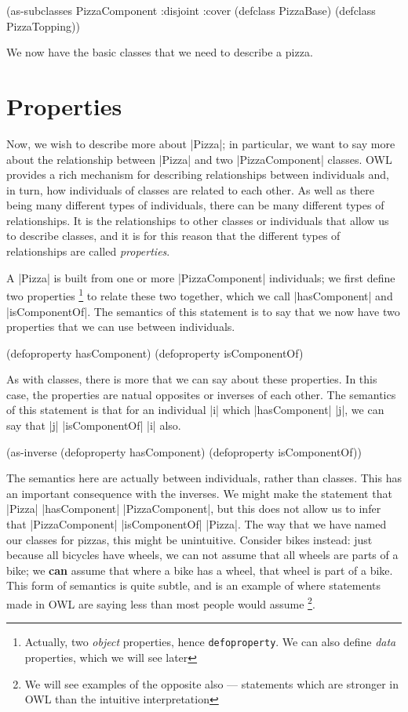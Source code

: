 \begin{tawny}
(as-subclasses
 PizzaComponent
 :disjoint :cover
 (defclass PizzaBase)
 (defclass PizzaTopping))
\end{tawny}

We now have the basic classes that we need to describe a pizza.

\section{Properties}
\label{sec:properties}

Now, we wish to describe more about |Pizza|; in particular, we want to say
more about the relationship between |Pizza| and two |PizzaComponent| classes.
OWL provides a rich mechanism for describing relationships between individuals
and, in turn, how individuals of classes are related to each other. As well as
there being many different types of individuals, there can be many
different types of relationships. It is the relationships to other classes or
individuals that allow us to describe classes, and it is for this reason that
the different types of relationships are called \emph{properties}.

A |Pizza| is built from one or more |PizzaComponent| individuals; we first
define two properties \footnote{Actually, two \emph{object} properties, hence
  \lstinline|defoproperty|. We can also define \emph{data} properties, which
  we will see later} to relate these two together, which we call
|hasComponent| and |isComponentOf|. The semantics of this statement is to say
that we now have two properties that we can use between individuals.

\begin{tawnyhidden}
(defoproperty hasComponent)
(defoproperty isComponentOf)
\end{tawnyhidden}

As with classes, there is more that we can say about these properties. In this
case, the properties are natual opposites or inverses of each other. The
semantics of this statement is that for an individual |i| which |hasComponent|
|j|, we can say that |j| |isComponentOf| |i| also. 

\begin{tawny}
(as-inverse
 (defoproperty hasComponent)
 (defoproperty isComponentOf))
\end{tawny}

The semantics here are actually between individuals, rather than
classes. This has an important consequence with the inverses. We might
make the statement that |Pizza| |hasComponent| |PizzaComponent|, but
this does not allow us to infer that |PizzaComponent| |isComponentOf|
|Pizza|. The way that we have named our classes for pizzas, this might
be unintuitive. Consider bikes instead: just because all bicycles have
wheels, we can not assume that all wheels are parts of a bike; we
\textbf{can} assume that where a bike has a wheel, that wheel is part
of a bike. This form of semantics is quite subtle, and is an example
of where statements made in OWL are saying less than most people would
assume \footnote{We will see examples of the opposite also ---
  statements which are stronger in OWL than the intuitive
  interpretation}.

